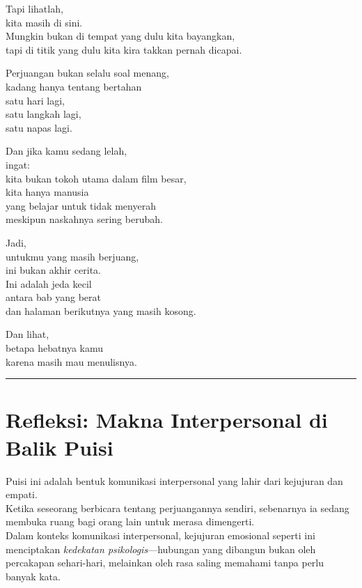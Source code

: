 \documentclass[
  letterpaper,
  DIV=11,
  numbers=noendperiod]{scrreprt}
\begin{document}
Tapi lihatlah,\\
kita masih di sini.\\
Mungkin bukan di tempat yang dulu kita bayangkan,\\
tapi di titik yang dulu kita kira takkan pernah dicapai.

Perjuangan bukan selalu soal menang,\\
kadang hanya tentang bertahan\\
satu hari lagi,\\
satu langkah lagi,\\
satu napas lagi.

Dan jika kamu sedang lelah,\\
ingat:\\
kita bukan tokoh utama dalam film besar,\\
kita hanya manusia\\
yang belajar untuk tidak menyerah\\
meskipun naskahnya sering berubah.

Jadi,\\
untukmu yang masih berjuang,\\
ini bukan akhir cerita.\\
Ini adalah jeda kecil\\
antara bab yang berat\\
dan halaman berikutnya yang masih kosong.

Dan lihat,\\
betapa hebatnya kamu\\
karena masih mau menulisnya.

\begin{center}\rule{0.5\linewidth}{0.5pt}\end{center}

\section{\texorpdfstring{\textbf{Refleksi: Makna Interpersonal di Balik
Puisi}}{Refleksi: Makna Interpersonal di Balik Puisi}}\label{refleksi-makna-interpersonal-di-balik-puisi}

Puisi ini adalah bentuk komunikasi interpersonal yang lahir dari
kejujuran dan empati.\\
Ketika seseorang berbicara tentang perjuangannya sendiri, sebenarnya ia
sedang membuka ruang bagi orang lain untuk merasa dimengerti.\\
Dalam konteks komunikasi interpersonal, kejujuran emosional seperti ini
menciptakan \emph{kedekatan psikologis}---hubungan yang dibangun bukan
oleh percakapan sehari-hari, melainkan oleh rasa saling memahami tanpa
perlu banyak kata.
\end{document}
